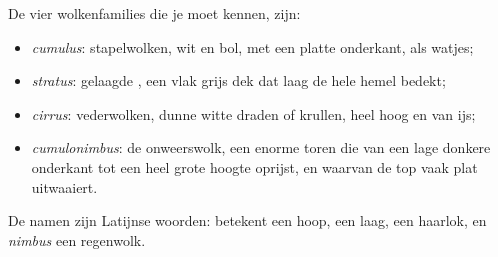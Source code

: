 \begin{definition}[Wolkenfamilies]\label{def:g4:clouds-rain-snow:cloud-families}
De vier wolkenfamilies die je moet kennen, zijn:
\begin{itemize}
  \item \emph{cumulus}: stapelwolken, wit en bol, met een
        platte onderkant, als watjes;
  \item \emph{stratus}: gelaagde , een vlak grijs
        dek dat laag de hele hemel bedekt;
  \item \emph{cirrus}: vederwolken, dunne witte draden of
        krullen, heel hoog en van ijs;
  \item \emph{cumulonimbus}: de onweerswolk, een enorme
        toren die van een lage donkere onderkant tot een heel grote hoogte
        oprijst, en waarvan de top vaak plat uitwaaiert.
\end{itemize}
\end{definition}

De namen zijn Latijnse woorden: \emph{} betekent een hoop,
\emph{} een laag, \emph{} een haarlok, en \emph{nimbus} een
regenwolk.

